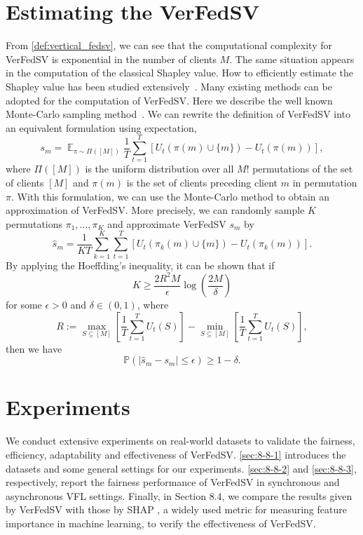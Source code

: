 \section{Estimating the VerFedSV} \label{sec:8-7}
From \autoref{def:vertical_fedsv}, we can see that the computational complexity for VerFedSV is exponential in the number of clients $M$. The same situation appears in the computation of the classical Shapley value. How to efficiently estimate the Shapley value has been studied extensively~\cite{ghorbani2019data,jia2019towards}. Many existing methods can be adopted for the computation of VerFedSV. Here we describe the well known Monte-Carlo sampling method~\cite{metropolis1949monte, ghorbani2019data}. We can rewrite the definition of VerFedSV into an equivalent formulation using expectation,
\begin{equation} \label{eq:complete_ev_expectation}
    s_m = \mathop{\mathbb{E}}_{\pi \sim \Pi([M])} \frac{1}{T}\sum_{t=1}^T [U_t(\pi(m)\cup\{m\}) - U_t(\pi(m))],
\end{equation}
where $\Pi([M])$ is the uniform distribution over all $M!$ permutations of the set of clients $[M]$ and $\pi(m)$ is the set of clients preceding client $m$ in permutation $\pi$. With this formulation, we can use the Monte-Carlo method to obtain an approximation of VerFedSV. More precisely, we can randomly sample $K$ permutations $\pi_1, \dots, \pi_K$ and approximate VerFedSV $s_m$ by 
\begin{equation} \label{eq:complete_ev_approx}
    \hat s_m = \frac{1}{KT}\sum_{k=1}^K \sum_{t=1}^T [U_t(\pi_k(m)\cup\{m\}) - U_t(\pi_k(m))].
\end{equation}
By applying the Hoeffding's inequality, it can be shown \cite{jia2019towards} that if 
\[K \geq \frac{2R^2M}{\epsilon}\log\left(\frac{2M}{\delta}\right)\]
for some $\epsilon > 0$ and $\delta \in (0, 1)$, where 
\[R := \max_{S \subseteq [M]} \left[\frac{1}{T}\sum_{t=1}^T U_t(S)\right] - \min_{S \subseteq [M]} \left[\frac{1}{T}\sum_{t=1}^T U_t(S)\right],\]
then we have 
\[\mathbb{P}(|\hat s_m - s_m| \leq \epsilon) \geq 1 - \delta.\]

\section{Experiments} \label{sec:8-8}
We conduct extensive experiments on real-world datasets to validate the fairness, efficiency, adaptability and effectiveness of VerFedSV. \autoref{sec:8-8-1} introduces the datasets and some general settings for our experiments. \autoref{sec:8-8-2} and \autoref{sec:8-8-3}, respectively, report the fairness performance of VerFedSV in synchronous and asynchronous VFL settings. Finally, in Section 8.4, we compare the results given by VerFedSV with those by SHAP \cite{lundberg2017unified}, a widely used metric for measuring feature importance in machine learning, to verify the effectiveness of VerFedSV. 

